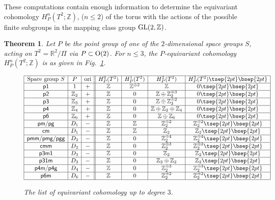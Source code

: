 \documentclass[pdftex]{sigma}
\newtheorem{thm}{Theorem}[section]
\theoremstyle{definition}
\newcommand{\R}{\mathbb{R}}
\newcommand{\Z}{\mathbb{Z}}
\begin{document}
These computations contain enough information to determine the equivariant cohomology $H^n_{P}(T^2; \Z)$, ($n \le 2$) of the torus with the actions of the possible f\/inite subgroups in the mapping class group ${\rm GL}(2, \Z)$.

\begin{thm} \label{thm:equiv_coh}
Let $P$ be the point group of one of the $2$-dimensional space groups $S$, acting on $T^2 = \R^2/\Pi$ via $P \subset {\rm O}(2)$. For $n \le 3$, the $P$-equivariant cohomology $H^n_P(T^2; \Z)$ is as given in Fig.~{\rm \ref{fig:list_equiv_coh}}.
\begin{figure}[htpb]
$$
\begin{array}{|c|c|c||c|c|c|c|}
\hline
\mbox{Space group $S$} & P & \mbox{ori} &
H^0_P(T^2) & H^1_P(T^2) & H^2_P(T^2) & H^3_P(T^2) \tsep{2pt}\bsep{2pt}\\
\hline
\mbox{\textsf{p1}} & 1 & + &
\Z & \Z^{\oplus 2} & \Z & 0 \tsep{2pt}\bsep{2pt}\\
\hline
\mbox{\textsf{p2}} & \Z_2 & + &
\Z & 0 & \Z \oplus \Z_2^{\oplus 3} & 0 \tsep{2pt}\bsep{2pt}\\
\hline
\mbox{\textsf{p3}} & \Z_3 & + &
\Z & 0 & \Z \oplus \Z_3^{\oplus 2} & 0 \tsep{2pt}\bsep{2pt}\\
\hline
\mbox{\textsf{p4}} & \Z_4 & + &
\Z & 0 & \Z \oplus \Z_2 \oplus \Z_4 & 0 \tsep{2pt}\bsep{2pt}\\
\hline
\mbox{\textsf{p6}} & \Z_6 & + &
\Z & 0 & \Z \oplus \Z_6 & 0 \tsep{2pt}\bsep{2pt}\\
\hline
\mbox{\textsf{pm}/\textsf{pg}} & D_1 & - &
\Z & \Z & \Z_2^{\oplus 2} & \Z_2^{\oplus 2} \tsep{2pt}\bsep{2pt}\\
\hline
\mbox{\textsf{cm}} & D_1 & - &
\Z & \Z & \Z_2 & \Z_2 \tsep{2pt}\bsep{2pt}\\
\hline
\mbox{\textsf{pmm}/\textsf{pmg}/\textsf{pgg}} & D_2 & - &
\Z & 0 & \Z_2^{\oplus 4} & \Z_2^{\oplus 4} \tsep{2pt}\bsep{2pt}\\
\hline
\mbox{\textsf{cmm}} & D_2 & - &
\Z & 0 & \Z_2^{\oplus 3} & \Z_2^{\oplus 2} \tsep{2pt}\bsep{2pt}\\
\hline
\mbox{\textsf{p3m1}} & D_3 & - &
\Z & 0 & \Z_2 & \Z_2 \tsep{2pt}\bsep{2pt}\\
\hline
\mbox{\textsf{p31m}} & D_3 & - &
\Z & 0 & \Z_3 \oplus \Z_2 & \Z_2 \tsep{2pt}\bsep{2pt}\\
\hline
\mbox{\textsf{p4m}/\textsf{p4g}} & D_4 & - &
\Z & 0 & \Z_2^{\oplus 3} & \Z_2^{\oplus 3} \tsep{2pt}\bsep{2pt}\\
\hline
\mbox{\textsf{p6m}} & D_6 & - &
\Z & 0 & \Z_2^{\oplus 2} & \Z_2^{\oplus 2} \tsep{2pt}\bsep{2pt}\\
\hline
\end{array}
$$
\caption{The list of equivariant cohomology up to degree $3$.}\label{fig:list_equiv_coh}
\end{figure}
\end{thm}
\end{document}
